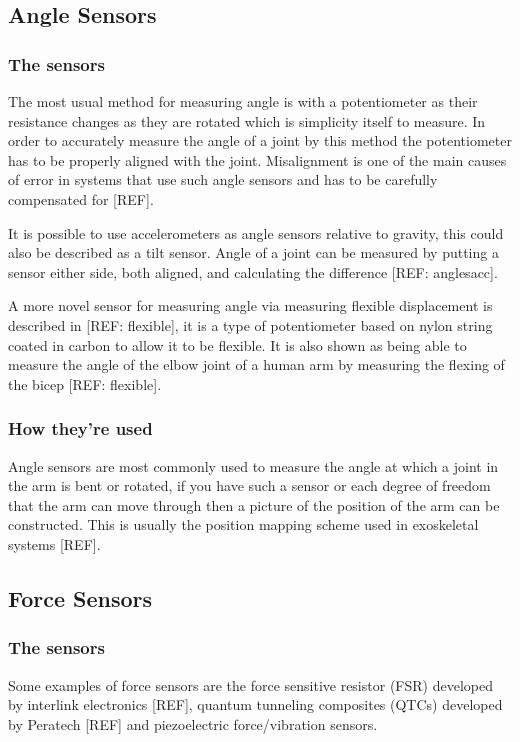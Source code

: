 \documentclass[journal]{IEEEtran}
\begin{document}
\subsection{Angle Sensors} 
\subsubsection{The sensors}
The most usual method for measuring angle is with a potentiometer as their resistance changes as 
they are rotated which is simplicity itself to measure. In order to accurately measure the angle of 
a joint by this method the potentiometer has to be properly aligned with the joint. Misalignment is 
one of the main causes of error in systems that use such angle sensors and has to be carefully 
compensated for [REF].

It is possible to use accelerometers as angle sensors relative to gravity, this could also be described 
as a tilt sensor. Angle of a joint can be measured by putting a sensor either side, both aligned, and 
calculating the difference [REF: anglesacc].

A more novel sensor for measuring angle via measuring flexible displacement is described in [REF: flexible], 
it is a type of potentiometer based on nylon string coated in carbon to allow it to be flexible. It is also shown as 
being able to measure the angle of the elbow joint of a human arm by measuring the flexing of the bicep [REF: flexible].

\subsubsection{How they're used}
Angle sensors are most commonly used to measure the angle at which a joint in the arm is bent or 
rotated, if you have such a sensor or each degree of freedom that the arm can move through then a 
picture of the position of the arm can be constructed. This is usually the position mapping scheme 
used in exoskeletal systems [REF].

\subsection{Force Sensors}
\subsubsection{The sensors}
Some examples of force sensors are the force sensitive resistor (FSR) developed by interlink 
electronics [REF], quantum tunneling composites (QTCs) developed by Peratech [REF] and 
piezoelectric force/vibration sensors.
\end{document}
